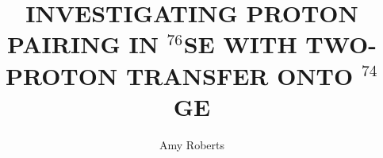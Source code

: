 \documentclass[textrefs,final,noinfo,12pt]{nddiss2e}
\newcommand{\Ge}[1]{$^{#1}$Ge\xspace}
\newcommand{\Se}[1]{$^{#1}$Se\xspace}
\newcommand{\reaction}{$^{74,76}$Ge($^3$He,n)$^{76,78}$Se\xspace}
\newcommand{\zvbb}{$0\nu\beta\beta$\xspace}
\newcommand{\zp}{$0^+$\xspace}
\begin{document}
\frontmatter

\title{INVESTIGATING PROTON PAIRING IN $^{76}$SE WITH TWO-PROTON TRANSFER ONTO $^{74}$GE}
\author{Amy Roberts}

\maketitle
%
%

\makecopyright

\begin{abstract}

\end{abstract}
\end{document}
